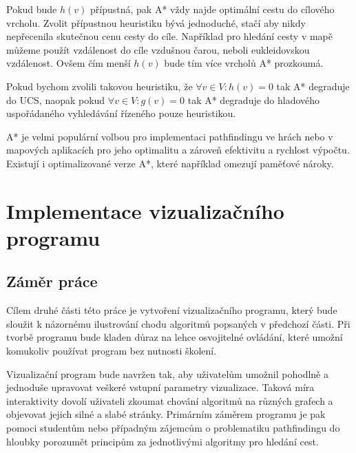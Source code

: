 \documentclass[12pt]{report}			%
\begin{document}
			 
			
			Pokud bude $h(v)$ přípustná, pak A* vždy najde optimální cestu do cílového vrcholu.		
			 Zvolit přípustnou heuristiku bývá jednoduché, stačí aby nikdy nepřecenila skutečnou cenu cesty do cíle. Například pro hledání cesty v mapě můžeme použít vzdálenost do cíle vzdušnou čarou, neboli eukleidovskou vzdálenost. Ovšem čím menší $h(v)$ bude tím více vrcholů A* prozkoumá. 
			
			Pokud bychom zvolili takovou heuristiku, že $\forall v \in V:h(v) = 0$ tak A* degraduje do UCS, naopak pokud $\forall v \in V:g(v) = 0 $ tak A* degraduje do hladového uspořádaného vyhledávání řízeného pouze heuristikou.
			
			
			
			A* je velmi populární volbou pro implementaci pathfindingu ve hrách nebo v mapových aplikacích pro jeho optimalitu a zároveň efektivitu a rychlost výpočtu. Existují i optimalizované verze A*, které například omezují paměťové nároky.
			
			
			
	
	\part{Implementace vizualizačního programu}
		
		\chapter{Záměr práce}
			Cílem druhé části této práce je vytvoření vizualizačního programu, který bude sloužit k názornému ilustrování chodu algoritmů popsaných v předchozí části. Při tvorbě programu bude kladen důraz na lehce osvojitelné ovládání, které umožní komukoliv používat program bez nutnosti školení.
			
			Vizualizační program bude navržen tak, aby uživatelům umožnil pohodlně a jednoduše upravovat veškeré vstupní parametry vizualizace. Taková míra interaktivity dovolí uživateli zkoumat chování algoritmů na různých grafech a objevovat jejich silné a slabé stránky.
			 Primárním záměrem programu je pak pomoci studentům nebo případným zájemcům o problematiku pathfindingu do hloubky porozumět principům za jednotlivými algoritmy pro hledání cest.
			 
\end{document}
